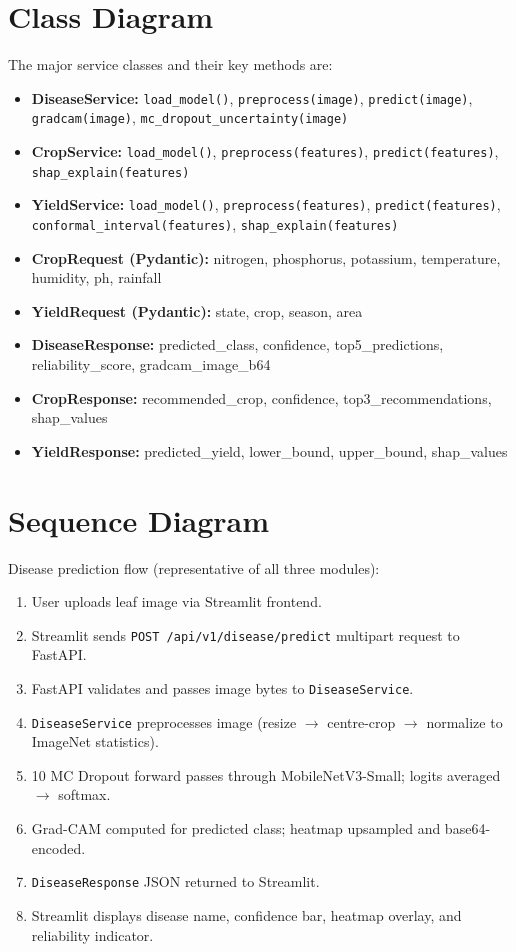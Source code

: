 \documentclass[12pt,a4paper]{report}
\begin{document}
\section{Class Diagram}
The major service classes and their key methods are:
\begin{itemize}[leftmargin=*]
  \item \textbf{DiseaseService:} \texttt{load\_model()}, \texttt{preprocess(image)}, \texttt{predict(image)}, \texttt{gradcam(image)}, \texttt{mc\_dropout\_uncertainty(image)}
  \item \textbf{CropService:} \texttt{load\_model()}, \texttt{preprocess(features)}, \texttt{predict(features)}, \texttt{shap\_explain(features)}
  \item \textbf{YieldService:} \texttt{load\_model()}, \texttt{preprocess(features)}, \texttt{predict(features)}, \texttt{conformal\_interval(features)}, \texttt{shap\_explain(features)}
  \item \textbf{CropRequest (Pydantic):} nitrogen, phosphorus, potassium, temperature, humidity, ph, rainfall
  \item \textbf{YieldRequest (Pydantic):} state, crop, season, area
  \item \textbf{DiseaseResponse:} predicted\_class, confidence, top5\_predictions, reliability\_score, gradcam\_image\_b64
  \item \textbf{CropResponse:} recommended\_crop, confidence, top3\_recommendations, shap\_values
  \item \textbf{YieldResponse:} predicted\_yield, lower\_bound, upper\_bound, shap\_values
\end{itemize}

\section{Sequence Diagram}
Disease prediction flow (representative of all three modules):
\begin{enumerate}[leftmargin=*]
  \item User uploads leaf image via Streamlit frontend.
  \item Streamlit sends \texttt{POST /api/v1/disease/predict} multipart request to FastAPI.
  \item FastAPI validates and passes image bytes to \texttt{DiseaseService}.
  \item \texttt{DiseaseService} preprocesses image (resize $\to$ centre-crop $\to$ normalize to ImageNet statistics).
  \item 10 MC Dropout forward passes through MobileNetV3-Small; logits averaged $\to$ softmax.
  \item Grad-CAM computed for predicted class; heatmap upsampled and base64-encoded.
  \item \texttt{DiseaseResponse} JSON returned to Streamlit.
  \item Streamlit displays disease name, confidence bar, heatmap overlay, and reliability indicator.
\end{enumerate}
\end{document}
